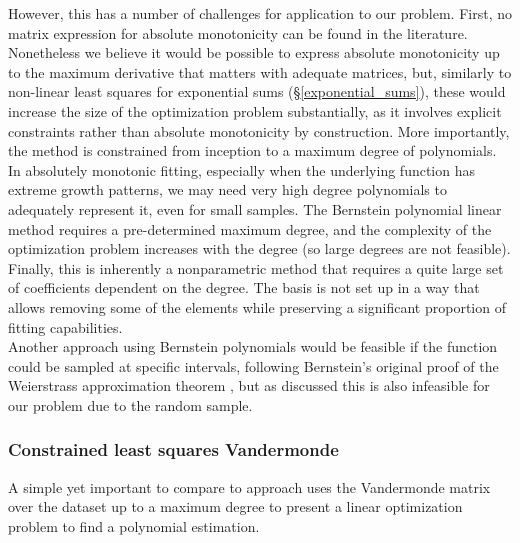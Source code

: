 \documentclass[12pt,a4paper]{article}
\begin{document}
However, this has a number of challenges for application to our problem. First, no matrix expression for absolute monotonicity can be found in the literature. Nonetheless we believe it would be possible to express absolute monotonicity up to the maximum derivative that matters with adequate matrices, but, similarly to non-linear least squares for exponential sums (\S \ref{exponential_sums}), these would increase the size of the optimization problem substantially, as it involves explicit constraints rather than absolute monotonicity by construction. More importantly, the method is constrained from inception to a maximum degree of polynomials. In absolutely monotonic fitting, especially when the underlying function has extreme growth patterns, we may need very high degree polynomials to adequately represent it, even for small samples. The Bernstein polynomial linear method requires a pre-determined maximum degree, and the complexity of the optimization problem increases with the degree (so large degrees are not feasible). Finally, this is inherently a nonparametric method that requires a quite large set of coefficients dependent on the degree. The basis is not set up in a way that allows removing some of the elements while preserving a significant proportion of fitting capabilities.\\

Another approach using Bernstein polynomials would be feasible if the function could be sampled at specific intervals, following Bernstein's original proof of the Weierstrass approximation theorem \cite{1912_bernstein_weierstrass_bernstein_polynomials}, but as discussed this is also infeasible for our problem due to the random sample.\\

\subsubsection{Constrained least squares Vandermonde}
\label{vandermonde}

A simple yet important to compare to approach uses the Vandermonde matrix over the dataset up to a maximum degree to present a linear optimization problem to find a polynomial estimation.\\
\end{document}
